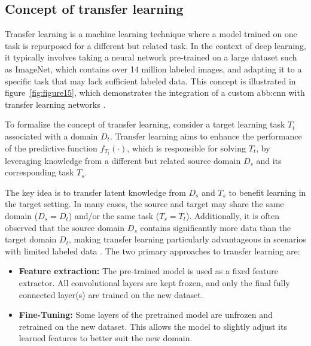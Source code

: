 \subsection{Concept of transfer learning}
Transfer learning is a machine learning technique where a model trained on one task is repurposed for a different but related task. In the context of deep learning, it typically involves taking a neural network pre-trained on a large dataset such as ImageNet, which contains over 14 million labeled images, and adapting it to a specific task that may lack sufficient labeled data. This concept is illustrated in figure~\ref{fig:figure15}, which demonstrates the integration of a custom \gls{abb:cnn} with transfer learning networks \parencite{tan2018survey}.


To formalize the concept of transfer learning, consider a target learning task \( T_t \) associated with a domain \( D_t \). Transfer learning aims to enhance the performance of the predictive function \( f_{T_t}(\cdot) \), which is responsible for solving \( T_t \), by leveraging knowledge from a different but related source domain \( D_s \) and its corresponding task \( T_s \).

The key idea is to transfer latent knowledge from \( D_s \) and \( T_s \) to benefit learning in the target setting. In many cases, the source and target may share the same domain (\( D_s = D_t \)) and/or the same task (\( T_s = T_t \)). Additionally, it is often observed that the source domain \( D_s \) contains significantly more data than the target domain \( D_t \), making transfer learning particularly advantageous in scenarios with limited labeled data \parencite{tan2018survey}.
The two primary approaches to transfer learning are:

\begin{itemize}
    \item \textbf{Feature extraction:} The pre-trained model is used as a fixed feature extractor. All convolutional layers are kept frozen, and only the final fully connected layer(s) are trained on the new dataset.
    \item \textbf{Fine-Tuning:} Some layers of the pretrained model are unfrozen and retrained on the new dataset. This allows the model to slightly adjust its learned features to better suit the new domain.
\end{itemize}


